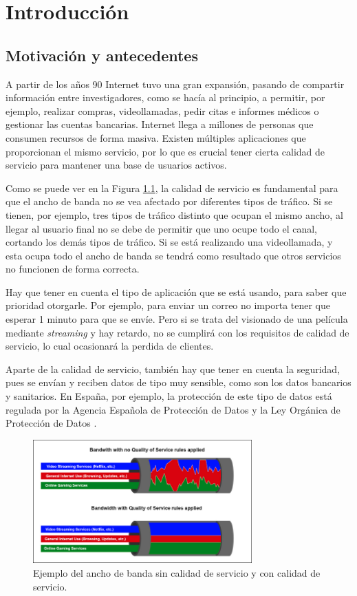 \chapter{Introducción}\label{introduccion}

\section{Motivación y antecedentes}

A partir de los años 90 Internet tuvo una gran expansión, pasando de compartir información entre investigadores, 
como se hacía al principio, a permitir, por ejemplo, realizar compras, videollamadas, pedir citas e informes médicos o gestionar 
las cuentas bancarias. Internet llega a millones de personas que consumen recursos de forma masiva. 
Existen múltiples aplicaciones que proporcionan el mismo servicio, por lo que es crucial tener cierta calidad de servicio 
\cite{microqos} para mantener una base de usuarios activos.

\intro Como se puede ver en la Figura \ref{Figura 1}, la calidad de servicio es fundamental para que el ancho de banda no se vea 
afectado por diferentes tipos de tráfico. Si se tienen, por ejemplo, tres tipos de tráfico distinto que ocupan el mismo ancho, al 
llegar al usuario final no se debe de permitir que uno ocupe todo el canal, cortando los demás tipos de tráfico. Si se está realizando 
una videollamada, y esta ocupa todo el ancho de banda se tendrá como resultado que otros servicios no funcionen de forma correcta.

\intro Hay que tener en cuenta el tipo de aplicación que se está usando, para saber que prioridad otorgarle. Por ejemplo, para 
enviar un correo no importa tener que esperar 1 minuto para que se envíe. Pero si se trata del visionado de una película mediante 
\textit{streaming} y hay retardo, no se cumplirá con los requisitos de calidad de servicio, lo cual ocasionará la perdida de clientes.

\intro Aparte de la calidad de servicio, también hay que tener en cuenta la seguridad, pues se envían y reciben datos de tipo muy 
sensible, como son los datos bancarios y sanitarios. En España, por ejemplo, la protección de este tipo de datos está regulada por la 
Agencia Española de Protección de Datos \cite{aepdindex} y la Ley Orgánica de Protección de Datos \cite{lopdindex}.

\begin{figure}[H]
  \includegraphics[width=0.75\textwidth]{imagenes/calidadservicio.png}
  \centering
  \caption{Ejemplo del ancho de banda sin calidad de servicio y con calidad de servicio.}\label{Figura 1}
\end{figure}

